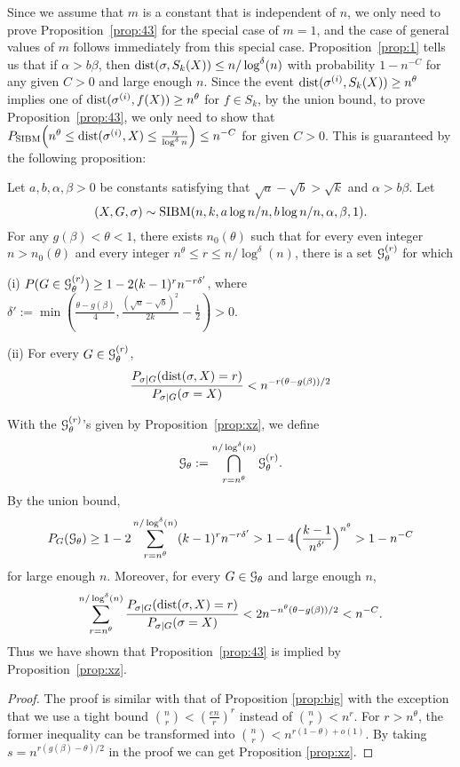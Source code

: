 \documentclass{article}
\begin{document}
Since we assume that $m$ is a constant that is independent of $n$,
we only need to prove Proposition~\ref{prop:43} for the special case of $m=1$, and the case of general values of $m$ follows immediately from this special case.
Proposition~\ref{prop:1} tells us that if $\alpha>b\beta$, then $\operatorname{dist}(\sigma,S_k(X)) \le n/\log^{\delta}(n)$
with probability $1-n^{-C}$ for any given $C>0$ and large enough $n$.
Since the event $\operatorname{dist}(\sigma^{(i)},S_k(X)) \geq n^{\theta}$ implies one of $\operatorname{dist}(\sigma^{(i)},f(X)) \geq n^{\theta}$ for $f\in S_k$,
by the union bound,
to prove Proposition~\ref{prop:43}, we only need to show that 
$P_{\operatorname{SIBM}} \Big(n^{\theta} \leq \operatorname{dist}(\sigma^{(i)},X) \leq \frac{n}{\log^{\delta} n}\Big) \leq n^{-C}$
for given $C>0$.
This is guaranteed by the following proposition:
\begin{proposition} \label{prop:xz}
Let $a,b,\alpha,\beta> 0$ be constants satisfying that $\sqrt{a}-\sqrt{b} > \sqrt{k}$ and $\alpha>b\beta$.
Let 
$$
(X,G,\sigma) \sim \operatorname{SIBM}(n, k, a\log n/n, b\log n/n,\alpha,\beta, 1) .
$$
For any $g(\beta)<\theta<1$, there exists $n_0(\theta)$ such that
for every even integer $n>n_0(\theta)$ and
every integer $n^{\theta} \le r \le n/\log^{\delta}(n)$,
there is a set $\mathcal{G}_{\theta}^{(r)}$ for which

\noindent (i)
$P(G\in\mathcal{G}_\theta^{(r)}) \ge 1- 2(k-1)^r n^{-r\delta'}$,
where $\delta':=\min(\frac{\theta - g(\beta)}{4},\frac{(\sqrt{a}-\sqrt{b})^2}{2k} - \frac{1}{2}) >0$.

\noindent (ii) For every $G\in\mathcal{G}_\theta^{(r)}$,
$$
\frac{P_{\sigma|G}(\operatorname{dist}(\sigma,X) = r )}
{P_{\sigma|G}(\sigma=X)} <
n^{-r (\theta - g(\beta)) /2}
$$
\end{proposition}
With the $\mathcal{G}_\theta^{(r)}$'s given by Proposition~\ref{prop:xz}, we
define 
$$
\mathcal{G}_\theta:=\bigcap_{r=n^{\theta}}^{n/\log^{\delta}(n)} \mathcal{G}_\theta^{(r)} .
$$
By the union bound,
$$
P_G(\mathcal{G}_\theta)\ge 1-2 \sum_{r=n^{\theta}}^{n/\log^{\delta}(n)} (k-1)^rn^{-r\delta'}
> 1-4 \Big(\frac{k-1}{n^{\delta'}}\Big)^{n^\theta}
>1-n^{-C}
$$
for large enough $n$.
Moreover, for every $G\in\mathcal{G}_\theta$ and large enough $n$,
\begin{align*}
 \sum_{r=n^{\theta}}^{n/\log^{\delta}(n)}
\frac{P_{\sigma|G}(\operatorname{dist}(\sigma,X) = r )}
{P_{\sigma|G}(\sigma=X)}  < 2n^{-n^{\theta}(\theta - g(\beta))/2} < n^{-C} .
\end{align*}
Thus we have shown that Proposition~\ref{prop:43} is implied by Proposition~\ref{prop:xz}.
\begin{proof}
The proof is similar with that of Proposition \ref{prop:big} with the exception that we use a tight bound
$\binom{n}{r} < (\frac{en}{r})^r$ instead of $\binom{n}{r}< n^r$. For $r>n^{\theta}$, the former inequality
can be transformed into $\binom{n}{r} < n^{r(1-\theta) + o(1)}$. By taking $s=n^{r(g(\beta) - \theta)/2}$
in the proof we can get
Proposition \ref{prop:xz}.
\end{proof}
\end{document}
